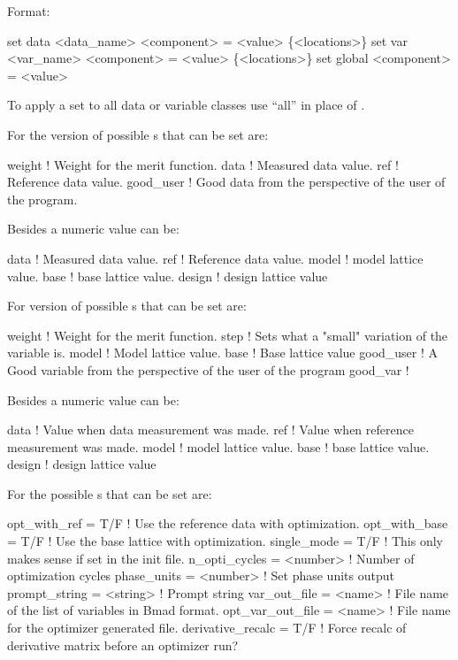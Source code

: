 Format:
\begin{example}
  set data <data_name> <component> = <value> \{<locations>\}
  set var <var_name> <component> = <value> \{<locations>\}
  set global <component> = <value>
\end{example}

\vskip 0.2in
To apply a set to all data or variable classes use ``all''
in place of .

For the  version of  possible 
s that can be set are:
\begin{example}
  weight      ! Weight for the merit function.
  data        ! Measured data value.
  ref         ! Reference data value.
  good_user   ! Good data from the perspective of the user of the \tao program.
\end{example}
Besides a numeric value  can be:
\begin{example}
  data        ! Measured data value.
  ref         ! Reference data value.
  model       ! model lattice value.
  base        ! base lattice value.
  design      ! design lattice value
\end{example}

For  version of  possible 
s that can be set are:
\begin{example}
  weight     ! Weight for the merit function.
  step       ! Sets what a "small" variation of the variable is.
  model      ! Model lattice value.
  base       ! Base lattice value
  good_user  ! A Good variable from the perspective of the user of the \tao program
  good_var   ! 
\end{example}
Besides a numeric value  can be:
\begin{example}
  data        ! Value when data measurement was made.
  ref         ! Value when reference measurement was made.
  model       ! model lattice value.
  base        ! base lattice value.
  design      ! design lattice value
\end{example}

For  the possible 
s that can be set are:
\begin{example}
  opt_with_ref      = T/F      ! Use the reference data with optimization.
  opt_with_base     = T/F      ! Use the base lattice with optimization.
  single_mode       = T/F      ! This only makes sense if set in the init file.
  n_opti_cycles     = <number> ! Number of optimization cycles
  phase_units       = <number> ! Set phase units output
  prompt_string     = <string> ! Prompt string
  var_out_file      = <name>   ! File name of the list of variables in Bmad format. 
  opt_var_out_file  = <name>   ! File name for the optimizer generated file.
  derivative_recalc = T/F      ! Force recalc of derivative matrix before an optimizer run?
\end{example}

